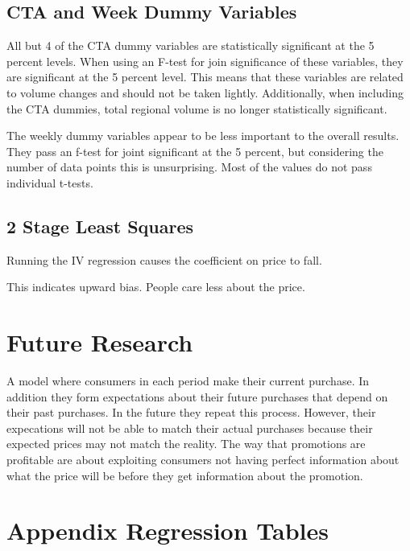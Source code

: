 \documentclass{article}
\begin{document}
\subsection{CTA and Week Dummy Variables}

All but 4 of the CTA dummy variables are statistically significant at the 5 percent levels. When using an F-test for join significance of these variables, they are significant at the 5 percent level. This means that these variables are related to volume changes and should not be taken lightly. Additionally, when including the CTA dummies, total regional volume is no longer statistically significant. 

The weekly dummy variables appear to be less important to the overall results. They pass an f-test for joint significant at the 5 percent, but considering the number of data points this is unsurprising. Most of the values do not pass individual t-tests.

\subsection{2 Stage Least Squares}

Running the IV regression causes the coefficient on price to fall.

This indicates upward bias. People care less about the price.


\section{Future Research}

A model where consumers in each period make their current purchase. In addition they form expectations about their future purchases that depend on their past purchases. In the future they repeat this process. However, their expecations will not be able to match their actual purchases because their expected prices may not match the reality. The way that promotions are profitable are about exploiting consumers not having perfect information about what the price will be before they get information about the promotion.


{}


\appendix

\section{Appendix Regression Tables}
\end{document}
